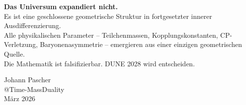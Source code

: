 \begin{keyresult}
\centering
\textbf{Das Universum expandiert nicht.}\\[0.3em]
Es ist eine geschlossene geometrische Struktur in fortgesetzter innerer Ausdifferenzierung.\\[0.3em]
Alle physikalischen Parameter -- Teilchenmassen, Kopplungskonstanten, CP-Verletzung, Baryonenasymmetrie -- emergieren aus einer einzigen geometrischen Quelle.\\[0.3em]
Die Mathematik ist falsifizierbar. DUNE 2028 wird entscheiden.
\end{keyresult}

\vspace{2em}
\begin{flushright}
Johann Pascher\\
@Time-MassDuality\\
März 2026
\end{flushright}
